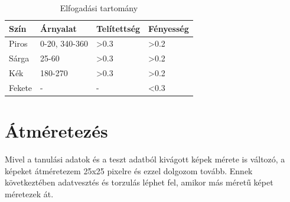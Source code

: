 \begin{center}
\begin{table}[h]
\centering
\begin{tabular}{ |p{3cm}||p{3cm}|p{3cm}|p{3cm}|  }
 \hline
 Szín & Árnyalat & Telítettség & Fényesség\\
 \hline
 Piros   & 0-20, 340-360    &>0.3& >0.2\\
 Sárga &   25-60  & >0.3 & >0.2\\
 Kék & 180-270 & >0.3 & >0.2\\
 Fekete    & - & - & <0.3\\
 \hline
\end{tabular}


\caption{Elfogadási tartomány}
\label{table:1}
\end{table}
\end{center}

\section{Átméretezés}

Mivel a tanulási adatok és a teszt adatból kivágott képek mérete is változó, a képeket átméretezem 25x25 pixelre és ezzel dolgozom tovább. Ennek következtében adatvesztés és torzulás léphet fel, amikor más méretű képet méretezek át.
